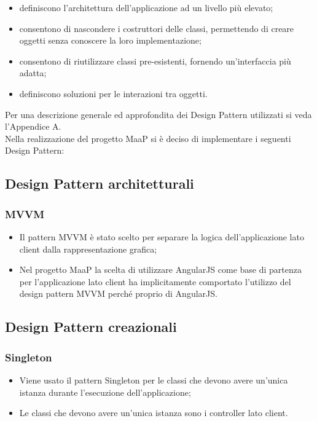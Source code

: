 \begin{itemize}
\item {} definiscono l'architettura dell'applicazione ad un livello più elevato;
\item {} consentono di nascondere i costruttori delle classi, permettendo di creare oggetti senza conoscere la loro implementazione;
\item {} consentono di riutilizzare classi pre-esistenti, fornendo un'interfaccia più adatta;
\item {} definiscono soluzioni per le interazioni tra oggetti.
\end{itemize}
Per una descrizione generale ed approfondita dei Design Pattern utilizzati si veda l'Appendice A.\\
Nella realizzazione del progetto MaaP si è deciso di implementare i seguenti Design Pattern:\\

\subsection{Design Pattern architetturali}
\subsubsection{MVVM}
\begin{itemize}
\item {} Il pattern MVVM è stato scelto per separare la logica dell'applicazione lato client dalla rappresentazione grafica;
\item {} Nel progetto MaaP la scelta di utilizzare AngularJS come base di partenza per l'applicazione lato client ha implicitamente comportato l'utilizzo del design pattern MVVM perché proprio di AngularJS.
\end{itemize}

\subsection{Design Pattern creazionali}
\subsubsection{Singleton}
\begin{itemize}
\item {} Viene usato il pattern Singleton per le classi che devono avere un'unica istanza durante l'esecuzione dell'applicazione;
\item {} Le classi che devono avere un'unica istanza sono i controller lato client.
\end{itemize}

